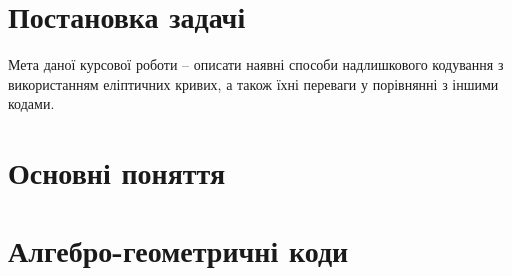 \documentclass[a4paper,12pt,oneside]{article}
\begin{document}
\section{Постановка задачі}
Мета даної курсової роботи -- описати наявні способи надлишкового кодування з використанням еліптичних кривих, а також їхні переваги у порівнянні з іншими кодами.

\section{Основні поняття}

\section{Алгебро-геометричні коди}

\nocite{*}

\clearpage
{}

\end{document}
